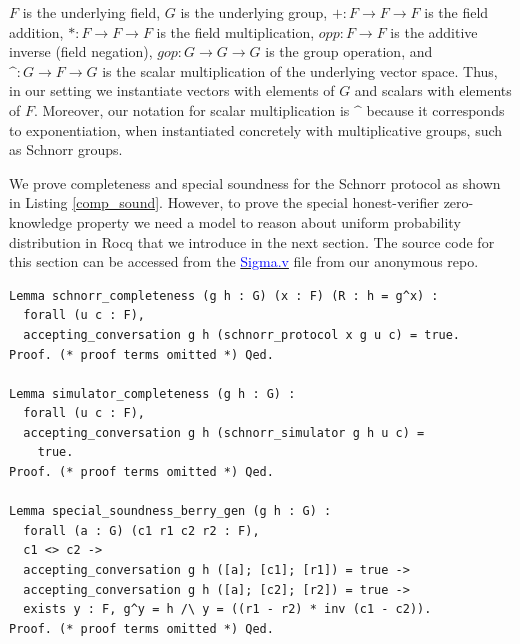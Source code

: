 \documentclass[sigconf,anonymous,review]{acmart}
\begin{document}
\noindent
 $F$ is the underlying field, $G$ is the underlying group,
 $+ : F \rightarrow F \rightarrow F$ is the field addition,
 $* : F \rightarrow F \rightarrow F$ is the field multiplication, 
 $opp : F \rightarrow F$ is the additive inverse (field negation),
 $gop : G \rightarrow G \rightarrow G$ is the group operation, and
 $\mbox{\textasciicircum}: G \rightarrow F \rightarrow G$ is the scalar multiplication of the underlying vector space.  
Thus, in our setting we instantiate vectors with elements of $G$ and scalars with elements of $F$. 
Moreover, our notation for scalar multiplication is $\mbox{\textasciicircum}$ because it corresponds to exponentiation, 
when instantiated concretely with multiplicative groups, such as Schnorr groups.

We prove completeness and special soundness for the Schnorr protocol 
as shown in Listing \ref{comp_sound}. However, to prove the special honest-verifier 
zero-knowledge property we need a model to reason about uniform probability 
distribution in Rocq that we introduce in the next section. The source code for this section can be accessed from the
\href{https://anonymous.4open.science/r/SigmaProtocol-EBA5/src/Crypto/Sigma.v}{\textcolor{blue}{Sigma.v}} file from our anonymous repo.
 


\begin{lstlisting}[frame=single, language=Coq, caption={Completeness and Soundness},
  label={comp_sound},captionpos=t, basicstyle=\ttfamily\footnotesize,
  abovecaptionskip=-\medskipamount]
Lemma schnorr_completeness (g h : G) (x : F) (R : h = g^x) :
  forall (u c : F),
  accepting_conversation g h (schnorr_protocol x g u c) = true.
Proof. (* proof terms omitted *) Qed.
  
Lemma simulator_completeness (g h : G) : 
  forall (u c : F), 
  accepting_conversation g h (schnorr_simulator g h u c) =
    true.
Proof. (* proof terms omitted *) Qed. 
  
Lemma special_soundness_berry_gen (g h : G) : 
  forall (a : G) (c1 r1 c2 r2 : F),
  c1 <> c2 -> 
  accepting_conversation g h ([a]; [c1]; [r1]) = true ->  
  accepting_conversation g h ([a]; [c2]; [r2]) = true ->
  exists y : F, g^y = h /\ y = ((r1 - r2) * inv (c1 - c2)).
Proof. (* proof terms omitted *) Qed.
\end{lstlisting}
 
\end{document}
